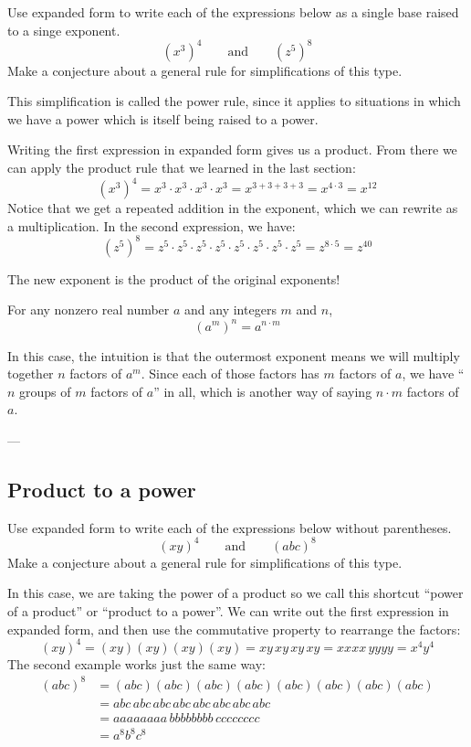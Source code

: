 \begin{boxexplore}[Derivation \#2]
Use expanded form to write each of the expressions below as a single base raised to a singe exponent.
\[(x^3)^4 \qquad\text{and}\qquad (z^5)^8\]
Make a conjecture about a general rule for simplifications of this type.
\end{boxexplore}

This simplification is called the power rule, since it applies to situations in which we have a power which is itself being raised to a power.

Writing the first expression in expanded form gives us a product. From there we can apply the product rule that we learned in the last section:
\[(x^3)^4 = x^3 \cdot x^3 \cdot x^3 \cdot x^3 = x^{3+3+3+3} = x^{4\cdot3} = x^{12}\]
Notice that we get a repeated addition in the exponent, which we can rewrite as a multiplication. In the second expression, we have:
\[(z^5)^8 = z^5 \cdot z^5 \cdot z^5 \cdot z^5 \cdot z^5 \cdot z^5 \cdot z^5 \cdot z^5 = z^{8\cdot5} = z^{40}\]

The new exponent is the product of the original exponents!

\begin{boxdef}
For any nonzero real number $a$ and any integers $m$ and $n$, \[(a^m)^n = a^{n \cdot m}\]
\end{boxdef}

In this case, the intuition is that the outermost exponent means we will multiply together $n$ factors of $a^m$. Since each of those factors has $m$ factors of $a$, we have ``$n$ groups of $m$ factors of $a$'' in all, which is another way of saying $n \cdot m$ factors of $a$.

\begin{boxex}
---
\end{boxex}


\subsection{Product to a power}

\begin{boxexplore}[Derivation \#3]
Use expanded form to write each of the expressions below without parentheses.
\[(xy)^4 \qquad\text{and}\qquad (abc)^8\]
Make a conjecture about a general rule for simplifications of this type.
\end{boxexplore}

In this case, we are taking the power of a product so we call this shortcut ``power of a product'' or ``product to a power''. We can write out the first expression in expanded form, and then use the commutative property to rearrange the factors:
\[(xy)^4 = (xy)(xy)(xy)(xy) = xy\,xy\,xy\,xy = xxxx\,yyyy = x^4y^4\]
The second example works just the same way:
\[
\begin{aligned}(abc)^8 &= (abc)(abc)(abc)(abc)(abc)(abc)(abc)(abc)
\\ &= abc\,abc\,abc\,abc\,abc\,abc\,abc\,abc
\\ &= aaaaaaaa\,bbbbbbbb\,cccccccc
\\ &= a^8b^8c^8
\end{aligned}\]


